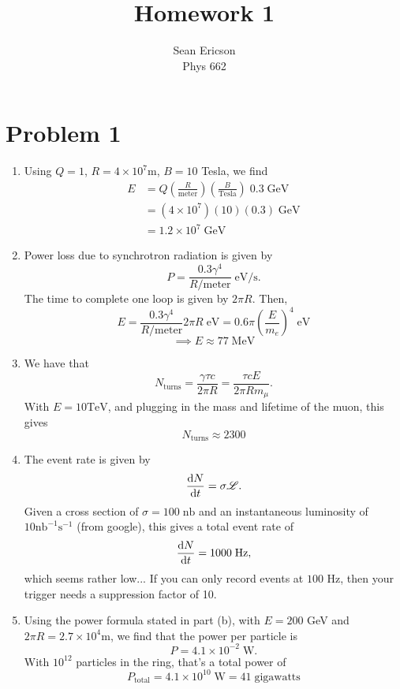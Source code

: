 \documentclass[12pt]{article}
\begin{document}
\title{Homework 1}
\author{Sean Ericson \\ Phys 662}
\maketitle

\section*{Problem 1}
\begin{enumerate}[label=(\alph*)]
    \item Using $Q = 1$, $R = 4\times10^7$m, $B = 10$ Tesla, we find
    \begin{align*}
        E &= Q \left(\frac{R}{\text{meter}}\right)\left(\frac{B}{\text{Tesla}}\right)\;0.3\;\text{GeV} \\
        &= (4\times10^7)(10)(0.3) \;\text{GeV} \\
        &= 1.2\times10^7 \;\text{GeV}
    \end{align*}

    \item Power loss due to synchrotron radiation is given by
    \[ P = \frac{0.3 \gamma^4}{R/\text{meter}} \;\text{eV/s}. \]
    The time to complete one loop is given by $2 \pi R$.
    Then,
    \[ E = \frac{0.3 \gamma^4}{R/\text{meter}} 2 \pi R \;\text{eV} = 0.6\pi\left(\frac{E}{m_e}\right)^4 \;\text{eV}\]
    \[ \implies E \approx 77\;\text{MeV} \]

    \item We have that
    \[ N_\text{turns} = \frac{\gamma\tau c}{2\pi R} = \frac{\tau c E}{2 \pi R m_\mu}. \]
    With $E = 10 \text{TeV}$, and plugging in the mass and lifetime of the muon, this gives
    \[ N_\text{turns} \approx 2300 \]

    \item The event rate is given by
    \[ \dv{N}{t} = \sigma \mathscr{L}. \]
    Given a cross section of $\sigma = 100 \;\text{nb}$ and an instantaneous luminosity of $10\text{nb}^{-1}\text{s}^{-1}$ (from google), this gives a total event rate of 
    \[ \dv{N}{t} = 1000 \;\text{Hz}, \]
    which seems rather low... If you can only record events at $100$ Hz, then your trigger needs a suppression factor of 10.

    \item Using the power formula stated in part (b), with $E = 200$ GeV and $2\pi R = 2.7\times10^4$m, we find that the power per particle is
    \[ P = 4.1\times10^{-2} \;\text{W}. \]
    With $10^{12}$ particles in the ring, that's a total power of
    \[ P_\text{total} = 4.1\times10^10 \;\text{W} = 41 \;\text{gigawatts} \]
\end{enumerate}
\end{document}
